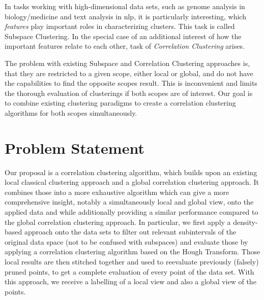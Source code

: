 In tasks working with high-dimensional data sets, such as genome analysis in biology/medicine and text analysis in \gls{nlp}, it is particularly interesting, which \textit{features} play important roles in characterizing clusters. This task is called Subspace Clustering. In the special case of an additional interest of how the important features relate to each other, task of \textit{Correlation Clustering} arises.

The problem with existing Subspace and Correlation Clustering approaches is, that they are restricted to a given scope, either local or global, and do not have the capabilities to find the opposite scopes result. This is inconvenient and limits the thorough evaluation of clusterings if both scopes are of interest. Our goal is to combine existing clustering paradigms to create a correlation clustering algorithms for both scopes simultaneously.





\section{Problem Statement}
Our proposal is a correlation clustering algorithm, which builds upon an existing local classical clustering approach and a global correlation clustering approach. It combines those into a more exhaustive algorithm which can give a more comprehensive insight, notably a simultaneously local and global view, onto the applied data and while additionally providing a similar performance compared to the global correlation clustering approach. In particular, we first apply a density-based approach onto the data sets to filter out relevant subintervals of the original data space (not to be confused with subspaces) and evaluate those by applying a correlation clustering algorithm based on the Hough Transform. Those local results are then stitched together and used to reevaluate previously (falsely) pruned points, to get a complete evaluation of every point of the data set. With this approach, we receive a labelling of a local view and also a global view of the points. 

